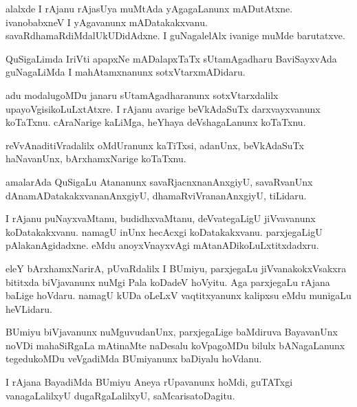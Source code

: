 \documentclass{article}
\begin{document}
\begin{mn}
alalxde I rAjanu rAjasUya muMtAda yAgagaLanunx mADutAtxne. ivanobabxneV 
I yAgavanunx mADatakakxvanu. savaRdhamaRdiMdalUkUDidAdxne.  I guNagalelAlx 
ivanige muMde barutatxve. 
\end{mn}

\begin{mn}
QuSigaLimda IriVti apapxNe mADalapxTaTx sUtamAgadharu BaviSayxvAda  guNagaLiMda 
I mahAtamxnanunx sotxVtarxmADidaru.
\end{mn}

\begin{mn}
adu modalugoMDu janaru sUtamAgadharanunx sotxVtarxdalilx  upayoVgisikoLuLxtAtxre.  
I rAjanu avarige beVkAdaSuTx darxvayxvanunx koTaTxnu. cAraNarige kaLiMga, 
heYhaya deVshagaLanunx koTaTxnu.
\end{mn}

\begin{mn}
reVvAnaditiVradalilx oMdUranunx kaTiTxsi, adanUnx,  beVkAdaSuTx haNavanUnx, bArxhamxNarige koTaTxnu.
\end{mn}

\begin{mn}
amalarAda QuSigaLu Atananunx savaRjacnxnanAnxgiyU, savaRvanUnx dAnamADatakakxvananAnxgiyU, 
dhamaRviVrananAnxgiyU, tiLidaru.
\end{mn}

\begin{mn}
I rAjanu puNayxvaMtanu, budidhxvaMtanu, deVvategaLigU jiVvavanunx koDatakakxvanu.  
namagU inUnx hecAcxgi koDatakakxvanu. parxjegaLigU pAlakanAgidadxne. 
eMdu anoyxVnayxvAgi mAtanADikoLuLxtitxdadxru.
\end{mn}

\begin{mn}
eleY bArxhamxNarirA, pUvaRdalilx I BUmiyu, parxjegaLu jiVvanakokxVsakxra  
bititxda biVjavanunx nuMgi Pala koDadeV hoVyitu. Aga parxjegaLu rAjana 
baLige hoVdaru. namagU kUDa oLeLxV vaqtitxyanunx kalipxsu eMdu munigaLu heVLidaru.
\end{mn}

\begin{mn}
BUmiyu biVjavanunx nuMguvudanUnx, parxjegaLige baMdiruva BayavanUnx noVDi 
mahaSiRgaLa mAtinaMte naDesalu koVpagoMDu bilulx bANagaLanunx tegedukoMDu 
veVgadiMda BUmiyanunx baDiyalu hoVdanu.
\end{mn}

\begin{mn}
I rAjana BayadiMda BUmiyu Aneya rUpavanunx hoMdi, guTATxgi vanagaLalilxyU 
dugaRgaLalilxyU, saMcarisatoDagitu.
\end{mn}
\end{document}

